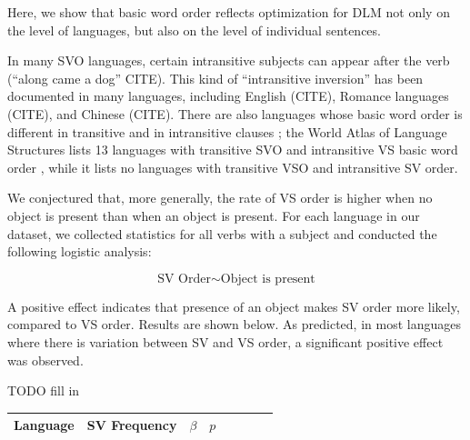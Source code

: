 \documentclass[11pt,a4paper]{article}
\begin{document}
Here, we show that basic word order reflects optimization for DLM not only on the level of languages, but also on the level of individual sentences.

In many SVO languages, certain intransitive subjects can appear after the verb (``along came a dog'' CITE).
This kind of ``intransitive inversion'' has been documented in many languages, including English (CITE), Romance languages (CITE), and Chinese (CITE).
There are also languages whose basic word order is different in transitive and in intransitive clauses \citep{wals-82}; the World Atlas of Language Structures lists 13 languages with transitive SVO and intransitive VS basic word order \citep{wals-81,wals-82}, while it lists no languages with transitive VSO and intransitive SV order.


We conjectured that, more generally, the rate of VS order is higher when no object is present than when an object is present.
For each language in our dataset, we collected statistics for all verbs with a subject and conducted the following logistic analysis:

\begin{equation}
\text{SV Order} \sim \text{Object is present}
\end{equation}

A positive effect indicates that presence of an object makes SV order more likely, compared to VS order.
Results are shown below.
As predicted, in most languages where there is variation between SV and VS order, a significant positive effect was observed.

TODO fill in
\begin{longtable}{l|lllllll}
Language & SV Frequency & $\beta$ & $p$ \\ \hline

\end{longtable}
\end{document}
